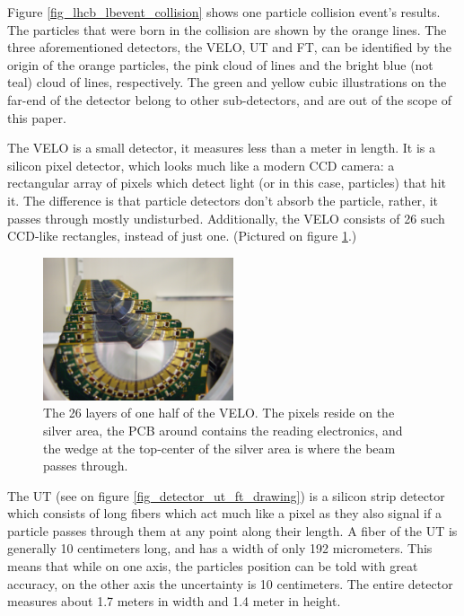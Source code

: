 \documentclass[12pt]{article}
\begin{document}
Figure \ref{fig_lhcb_lbevent_collision} shows one particle collision event's results. The particles that were born in the collision are shown by the orange lines. The three aforementioned detectors, the VELO, UT and FT, can be identified by the origin of the orange particles, the pink cloud of lines and the bright blue (not teal) cloud of lines, respectively. The green and yellow cubic illustrations on the far-end of the detector belong to other sub-detectors, and are out of the scope of this paper.

The VELO is a small detector, it measures less than a meter in length. It is a silicon pixel detector, which looks much like a modern CCD camera: a rectangular array of pixels which detect light (or in this case, particles) that hit it. The difference is that particle detectors don't absorb the particle, rather, it passes through mostly undisturbed. Additionally, the VELO consists of 26 such CCD-like rectangles, instead of just one. (Pictured on figure \ref{fig_detector_velo_real}.)

\begin{figure}[h]
	\begin{center}
		\includegraphics[width=0.5\textwidth]{detector_velo_real}
	\end{center}
	\caption[LHCb's VELO subdetector]{The 26 layers of one half of the VELO. The pixels reside on the silver area, the PCB around contains the reading electronics, and the wedge at the top-center of the silver area is where the beam passes through. \cite{cern_document_server}}
	\label{fig_detector_velo_real}
\end{figure}

The UT (see on figure \ref{fig_detector_ut_ft_drawing}) is a silicon strip detector which consists of long fibers which act much like a pixel as they also signal if a particle passes through them at any point along their length. A fiber of the UT is generally 10 centimeters long, and has a width of only 192 micrometers. This means that while on one axis, the particles position can be told with great accuracy, on the other axis the uncertainty is 10 centimeters. The entire detector measures about 1.7 meters in width and 1.4 meter in height.
\end{document}

